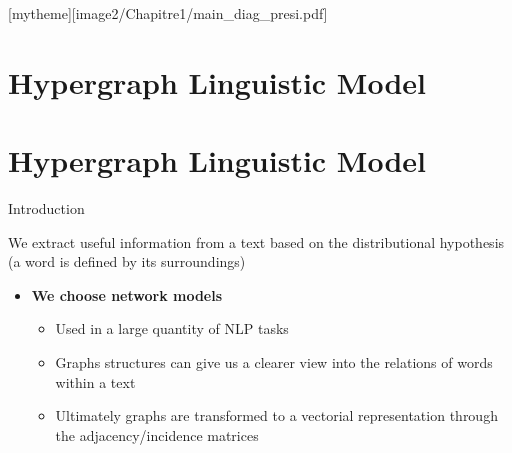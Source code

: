 \documentclass[10pt,=table]{beamer}
\begin{document}
[mytheme][image2/Chapitre1/main_diag_presi.pdf]

\section[Contributions in Detail]{Hypergraph Linguistic Model}
\section{Hypergraph Linguistic Model}
%


\begin{frame}{Introduction}

We extract useful information from a text based on the \textcolor{orangeEric}{distributional hypothesis} (a word is defined by its surroundings) 
\begin{itemize}
	\item \textbf{We choose network models} 
		\begin{itemize}
		\item Used in a large quantity of NLP tasks 
		\item Graphs structures can give us a clearer view into the relations of words within a text 	
		\item Ultimately graphs are transformed to a vectorial representation through the adjacency/incidence matrices
		
		\end{itemize}
		
\end{itemize}
\vspace{\textheight}
\end{frame}
\end{document}
